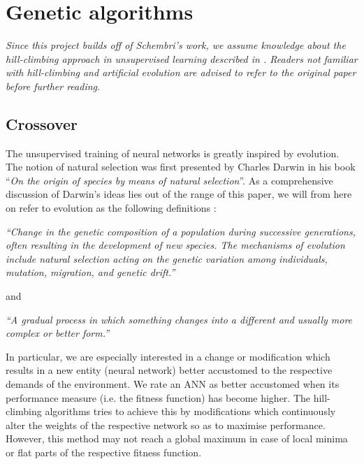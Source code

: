 \documentclass[10pt,a4paper,DIV=11]{scrreprt}
\begin{document}
\section{Genetic algorithms}
\textit{Since this project builds off of Schembri's work, we assume knowledge about the hill-climbing approach in unsupervised learning described in \cite{DANIEL}. Readers not
familiar with hill-climbing and artificial evolution are advised to refer to the original paper before further reading.} 

\subsection{Crossover}
The unsupervised training of neural networks is greatly inspired by evolution. The notion of natural selection was first presented by Charles Darwin in his book “\textit{On the origin of species by means of natural selection}”\cite{DARWIN}. 
As a comprehensive discussion of Darwin's ideas lies out of the range of this paper, we will from here on refer to evolution as the following definitions \cite{OXFORD}:

\begin{center}
\textit{“Change in the genetic composition of a population during successive generations, often resulting in the development of new species. The mechanisms of evolution include natural selection acting on the genetic variation among individuals, mutation, migration, and genetic drift.”}\\
\end{center}

and

\begin{center}
\textit{“A gradual process in which something changes into a different and usually more complex or better form.”}\\ 
\end{center}

In particular, we are especially interested in a change or modification which results in a new entity (neural network) better accustomed to the 
respective demands of the environment.  We rate an ANN as better accustomed when its performance measure (i.e. the fitness function) has become 
higher. The hill-climbing algorithms tries to achieve this by modifications which continuously alter the weights of the respective network so 
as to maximise performance. However, this method may not reach a global maximum in case of local minima or flat parts of the respective fitness 
function.
\end{document}
